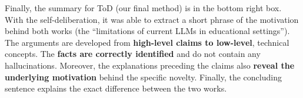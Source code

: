 Finally, the summary for ToD (our final method) is in the bottom right box. With the self-deliberation, it was able to extract a short phrase of the motivation behind both works (the ``limitations of current LLMs in educational settings''). The arguments are developed from \textbf{high-level claims to low-level}, technical concepts. The \textbf{facts are correctly identified} and do not contain any hallucinations. Moreover, the explanations preceding the claims also \textbf{reveal the underlying motivation} behind the specific novelty. Finally, the concluding sentence explains the exact difference between the two works.
